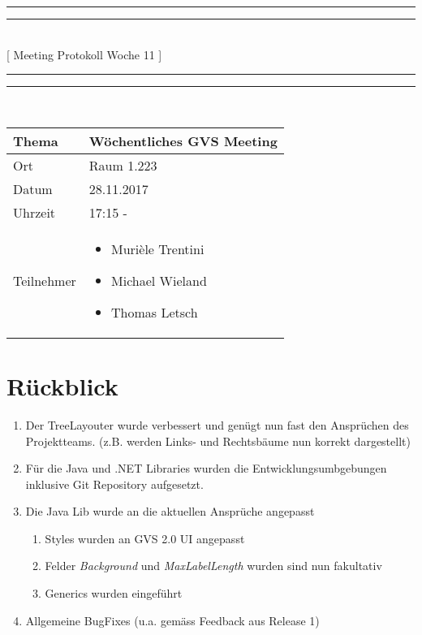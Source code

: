 \documentclass[11pt, a4paper,oneside]{scrartcl}
\begin{document}
	\centering
	\rule{\textwidth}{1.6pt}\vspace*{-\baselineskip}\vspace*{2pt} %
	\rule{\textwidth}{0.4pt}\\[\baselineskip] %
	{\LARGE [ Meeting Protokoll Woche 11 ]}\\[0.2\baselineskip] %
	\rule{\textwidth}{0.4pt}\vspace*{-\baselineskip}\vspace{3.2pt} %
	\rule{\textwidth}{1.6pt}\\[2\baselineskip] %
	
	\begin{tabu} to \linewidth {l X }
		\toprule
		\textbf{Thema} & \textbf{Wöchentliches GVS Meeting} \\
		\midrule
		Ort & Raum 1.223 \\
		Datum & 28.11.2017  \\
		Uhrzeit &  17:15 -  \\
		Teilnehmer & 
		\begin{minipage}[t]{\textwidth}
			\begin{itemize}
				\item Murièle Trentini
				\item Michael Wieland
				\item Thomas Letsch
			\end{itemize}
		\end{minipage}
		\\
		\bottomrule
	\end{tabu}
	
	
	\section{Rückblick}
	\begin{enumerate}
		\item Der TreeLayouter wurde verbessert und genügt nun fast den Ansprüchen des Projektteams. (z.B. werden Links- und Rechtsbäume nun korrekt dargestellt)
		\item Für die Java und .NET Libraries wurden die Entwicklungsumbgebungen inklusive Git Repository aufgesetzt.
		\item Die Java Lib wurde an die aktuellen Ansprüche angepasst
		\begin{enumerate}
			\item Styles wurden an GVS 2.0 UI angepasst
			\item Felder \textit{Background} und \textit{MaxLabelLength} wurden sind nun fakultativ
			\item Generics wurden eingeführt
		\end{enumerate}
	\item Allgemeine BugFixes (u.a. gemäss Feedback aus Release 1)
	\end{enumerate}
	
\end{document}

